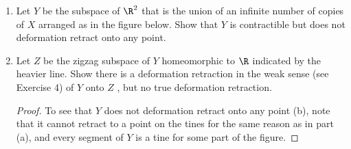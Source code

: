 \documentclass[12pt,letterpaper]{article}
\begin{document}
\begin{enumerate}
\begin{enumerate}[label=(\alph*)]
	\begin{proof}
	We can deformation retract all the tines down to $x$-axis, then retract in to the desired point, as shown in the figures:
	\begin{center}	
  $\simeq$
  $\simeq$
	\end{center}
	This fails however if we try to retract to a point on one of the tines, because there are other tines arbitrarily close to the one in question, and they cannot be retracted continuously. In general, no deformation retraction to a point on the tines can exist, because every neighborhood of such a point contains disconnected pieces of other tines, and the identity map on such a neighborhood cannot be nullhomotopic. 	
	\end{proof}		
	
	\item Let $Y$ be the subspace of $\R^2$ that is the union of an infinite number of copies of $X$ arranged as in the figure below. Show that $Y$ is contractible but does not deformation retract onto any point.
	\item Let $Z$ be the zigzag subspace of $Y$ homeomorphic to $\R$ indicated by the heavier
line. Show there is a deformation retraction in the weak sense (see Exercise 4) of $Y$ onto $Z$ , but no true deformation retraction.
	\begin{proof}
	To see that $Y$ does not deformation retract onto any point (b), note that it cannot retract to a point on the tines for the same reason as in part (a), and every segment of $Y$ is a tine for some part of the figure. 
	

\end{proof}
\end{enumerate}
\end{enumerate}
\end{document}
